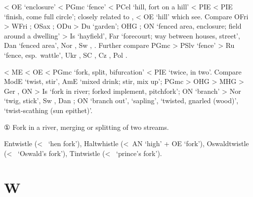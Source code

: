 \documentclass[12pt,letterpaper,oneside,article,draft]{memoir}
\begin{document}
\begin{Lemma}
\begin{Etymology}
	< OE  ‘enclosure’ < PGmc  ‘fence’ < PCel  ‘hill, fort on a hill’
		< PIE  < PIE  ‘finish, come full circle’;
		closely related to ,  < OE  ‘hill’ which see.
	Compare
	OFri  > WFri ;
	OSax ;
	ODu  > Du  ‘garden’;
	OHG ;
	ON  ‘fenced area, enclosure; field around a dwelling’ > Is  ‘hayfield’,
		Far  ‘forecourt; way between houses, street’,
		Dan  ‘fenced area’, Nor , Sw , .
	Further compare
	PGmc  > PSlv  ‘fence’ > Ru   ‘fence, esp.\ wattle’,
		Ukr  , SC , Cz , Pol .
\end{Etymology}
\end{Lemma}

\begin{Lemma}
\begin{Also}
\end{Also}
\begin{Etymology}
	< ME  < OE  < PGmc  ‘fork, split, bifurcation’
		< PIE  ‘twice, in two’.
	Compare
	ModE  ‘twist, stir’, AmE  ‘mixed drink; stir, mix up’;
	PGmc  > OHG  > MHG  > Ger ,
		ON  > Is  ‘fork in river; forked implement, pitchfork’;
	ON  ‘branch’ > Nor  ‘twig, stick’,
		Sw , Dan ;
	ON  ‘branch out’,  ‘sapling’,  ‘twisted, gnarled (wood)’,
		 ‘twist-scathing (sun epithet)’.
\end{Etymology}
\begin{Definitions}
	① Fork in a river, merging or splitting of two streams.
\end{Definitions}
\begin{Examples}
	Entwistle (<~ ‘hen fork’),
	Haltwhistle (<~AN  ‘high’ + OE  ‘fork’),
	Oswaldtwistle (<~ ‘Oswald’s fork’),
	Tintwistle (<~ ‘prince’s fork’).
\end{Examples}
\end{Lemma}

\section*{W}
\end{document}
